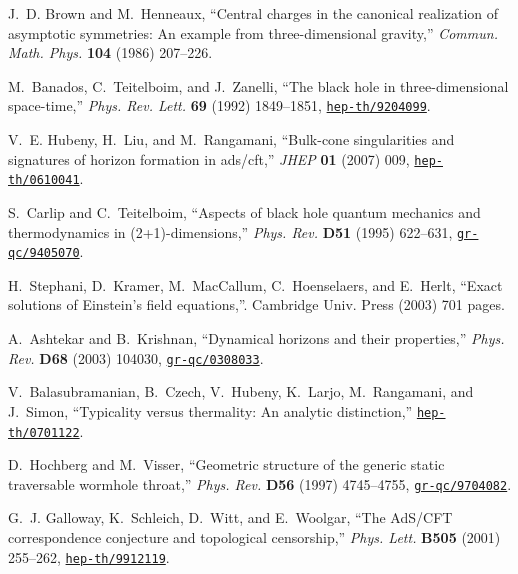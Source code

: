 \documentclass[12pt]{article}
\begin{document}
\begin{thebibliography}{10}
J.~D. Brown and M.~Henneaux, ``Central charges in the canonical realization of
  asymptotic symmetries: An example from three-dimensional gravity,''
{\em Commun. Math. Phys.} {\bf 104} (1986)  207--226.

M.~Banados, C.~Teitelboim, and J.~Zanelli, ``The black hole in
  three-dimensional space-time,'' {\em Phys. Rev. Lett.} {\bf 69} (1992)
  1849--1851,
\href{http://arxiv.org/abs/hep-th/9204099}{{\tt hep-th/9204099}}.

V.~E. Hubeny, H.~Liu, and M.~Rangamani, ``Bulk-cone singularities and
  signatures of horizon formation in ads/cft,'' {\em JHEP} {\bf 01} (2007)
  009,
\href{http://arxiv.org/abs/hep-th/0610041}{{\tt hep-th/0610041}}.

S.~Carlip and C.~Teitelboim, ``Aspects of black hole quantum mechanics and
  thermodynamics in (2+1)-dimensions,'' {\em Phys. Rev.} {\bf D51} (1995)
  622--631,
\href{http://arxiv.org/abs/gr-qc/9405070}{{\tt gr-qc/9405070}}.

H.~Stephani, D.~Kramer, M.~MacCallum, C.~Hoenselaers, and E.~Herlt, ``Exact
  solutions of Einstein's field equations,''. Cambridge Univ. Press (2003)
  701 pages.

A.~Ashtekar and B.~Krishnan, ``Dynamical horizons and their properties,'' {\em
  Phys. Rev.} {\bf D68} (2003)  104030,
\href{http://arxiv.org/abs/gr-qc/0308033}{{\tt gr-qc/0308033}}.

V.~Balasubramanian, B.~Czech, V.~Hubeny, K.~Larjo, M.~Rangamani, and J.~Simon,
  ``Typicality versus thermality: An analytic distinction,''
\href{http://arxiv.org/abs/hep-th/0701122}{{\tt hep-th/0701122}}.

D.~Hochberg and M.~Visser, ``Geometric structure of the generic static
  traversable wormhole throat,'' {\em Phys. Rev.} {\bf D56} (1997)  4745--4755,
\href{http://arxiv.org/abs/gr-qc/9704082}{{\tt gr-qc/9704082}}.

G.~J. Galloway, K.~Schleich, D.~Witt, and E.~Woolgar, ``The AdS/CFT
  correspondence conjecture and topological censorship,'' {\em Phys. Lett.}
  {\bf B505} (2001)  255--262,
\href{http://arxiv.org/abs/hep-th/9912119}{{\tt hep-th/9912119}}.


\end{thebibliography}
\end{document}
